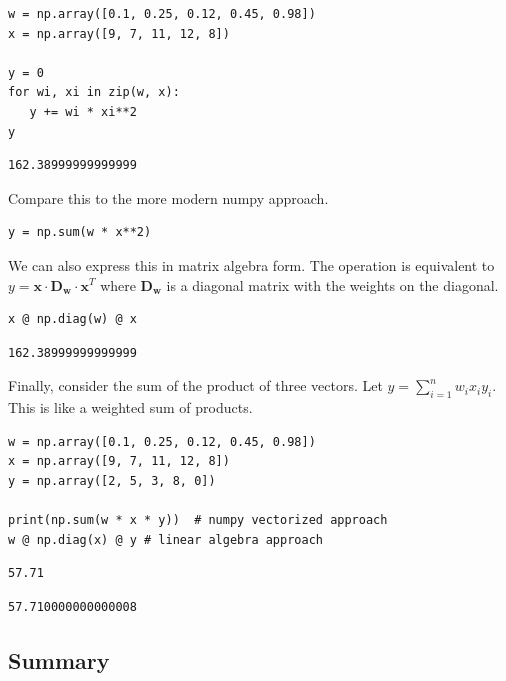 \documentclass[11pt]{article}
\begin{document}
\begin{verbatim}
w = np.array([0.1, 0.25, 0.12, 0.45, 0.98])
x = np.array([9, 7, 11, 12, 8])

y = 0
for wi, xi in zip(w, x):
   y += wi * xi**2
y
\end{verbatim}

\begin{verbatim}
162.38999999999999
\end{verbatim}

Compare this to the more modern numpy approach.

\begin{verbatim}
y = np.sum(w * x**2)
\end{verbatim}

We can also express this in matrix algebra form. The operation is equivalent to \(y = \mathbf{x} \cdot \mathbf{D_w} \cdot \mathbf{x}^T\) where \(\mathbf{D_w}\) is a diagonal matrix with the weights on the diagonal.

\begin{verbatim}
x @ np.diag(w) @ x
\end{verbatim}

\begin{verbatim}
162.38999999999999
\end{verbatim}

Finally, consider the sum of the product of three vectors. Let \(y = \sum\limits_{i=1}^n w_i x_i y_i\). This is like a weighted sum of products.

\begin{verbatim}
w = np.array([0.1, 0.25, 0.12, 0.45, 0.98])
x = np.array([9, 7, 11, 12, 8])
y = np.array([2, 5, 3, 8, 0])

print(np.sum(w * x * y))  # numpy vectorized approach
w @ np.diag(x) @ y # linear algebra approach
\end{verbatim}

\begin{verbatim}
57.71

\end{verbatim}

\begin{verbatim}
57.710000000000008
\end{verbatim}


\subsection{Summary}
\label{sec:org488750f}
\end{document}
